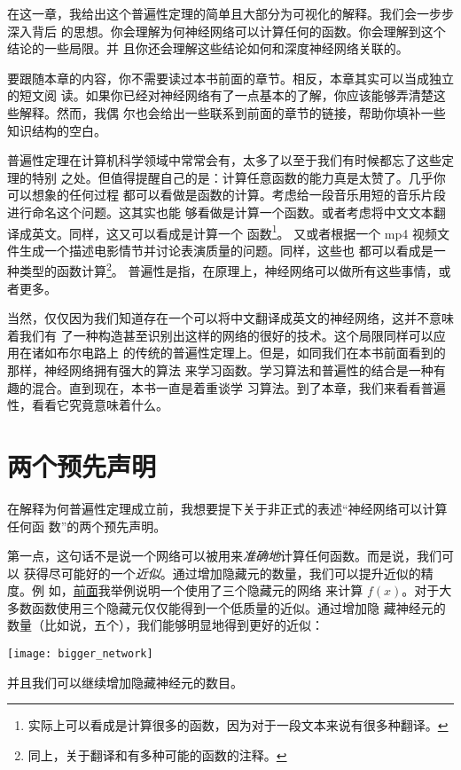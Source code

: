 在这一章，我给出这个普遍性定理的简单且大部分为可视化的解释。我们会一步步深入背后
的思想。你会理解为何神经网络可以计算任何的函数。你会理解到这个结论的一些局限。并
且你还会理解这些结论如何和深度神经网络关联的。

要跟随本章的内容，你不需要读过本书前面的章节。相反，本章其实可以当成独立的短文阅
读。如果你已经对神经网络有了一点基本的了解，你应该能够弄清楚这些解释。然而，我偶
尔也会给出一些联系到前面的章节的链接，帮助你填补一些知识结构的空白。

普遍性定理在计算机科学领域中常常会有，太多了以至于我们有时候都忘了这些定理的特别
之处。但值得提醒自己的是：计算任意函数的能力真是太赞了。几乎你可以想象的任何过程
都可以看做是函数的计算。考虑给一段音乐用短的音乐片段进行命名这个问题。这其实也能
够看做是计算一个函数。或者考虑将中文文本翻译成英文。同样，这又可以看成是计算一个
函数\footnote{实际上可以看成是计算很多的函数，因为对于一段文本来说有很多种翻译。}。
又或者根据一个 mp4 视频文件生成一个描述电影情节并讨论表演质量的问题。同样，这些也
都可以看成是一种类型的函数计算\footnote{同上，关于翻译和有多种可能的函数的注释。}。
普遍性是指，在原理上，神经网络可以做所有这些事情，或者更多。

当然，仅仅因为我们知道存在一个可以将中文翻译成英文的神经网络，这并不意味着我们有
了一种构造甚至识别出这样的网络的很好的技术。这个局限同样可以应用在诸如布尔电路上
的传统的普遍性定理上。但是，如同我们在本书前面看到的那样，神经网络拥有强大的算法
来学习函数。学习算法和普遍性的结合是一种有趣的混合。直到现在，本书一直是着重谈学
习算法。到了本章，我们来看看普遍性，看看它究竟意味着什么。

\section{两个预先声明}
\label{sec:two_caveats}

在解释为何普遍性定理成立前，我想要提下关于非正式的表述“神经网络可以计算任何函
数”的两个预先声明。

第一点，这句话不是说一个网络可以被用来\emph{准确地}计算任何函数。而是说，我们可以
获得尽可能好的一个\emph{近似}。通过增加隐藏元的数量，我们可以提升近似的精度。例
如，\hyperref[basic_network_precursor]{前面}我举例说明一个使用了三个隐藏元的网络
来计算 $f(x)$。对于大多数函数使用三个隐藏元仅仅能得到一个低质量的近似。通过增加隐
藏神经元的数量（比如说，五个），我们能够明显地得到更好的近似：
\begin{center}
  \texttt{[image: bigger\_network]}
\end{center}

并且我们可以继续增加隐藏神经元的数目。

